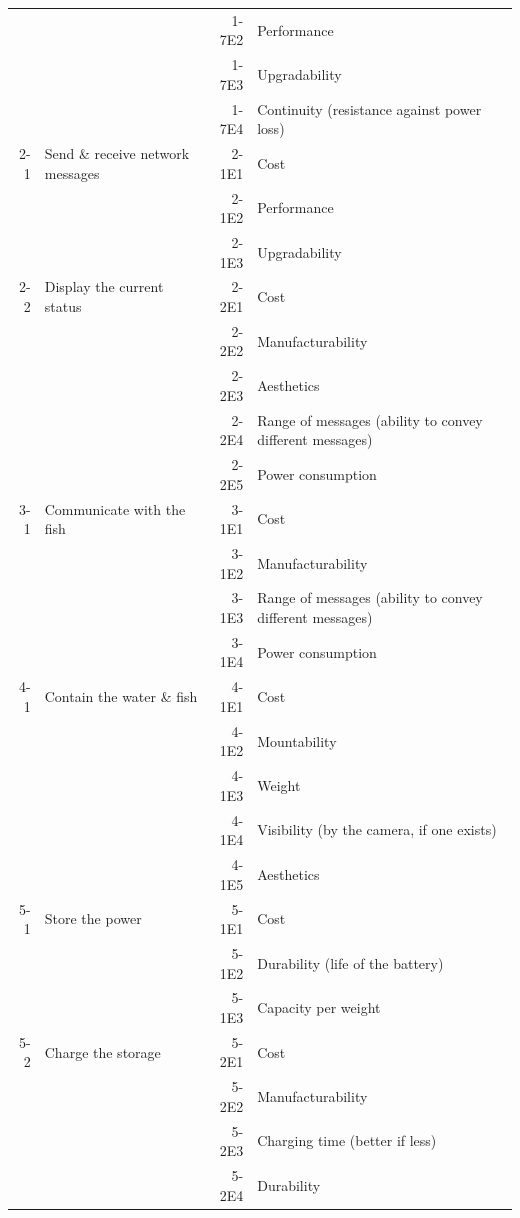 \documentclass[a4paper, 10pt, DIV=16, parskip = full, twocolumn = true]{scrartcl}
\begin{document}
\begin{table}
\begin{tabular}{rlrl}
		& & 1-7E2 & Performance \\	
		& & 1-7E3 & Upgradability \\
		& & 1-7E4 & Continuity (resistance against power loss) \\	
		2-1 & Send \& receive network messages & 2-1E1 & Cost \\
		& & 2-1E2 & Performance \\	
		& & 2-1E3 & Upgradability \\
		2-2 & Display the current status & 2-2E1 & Cost\\
		& & 2-2E2 & Manufacturability \\	
		& & 2-2E3 & Aesthetics \\	
		& & 2-2E4 & Range of messages (ability to convey different messages) \\	
		& & 2-2E5 & Power consumption \\	
		3-1 & Communicate with the fish & 3-1E1 & Cost \\
		& & 3-1E2 & Manufacturability \\		
		& & 3-1E3 & Range of messages (ability to convey different messages) \\	
		& & 3-1E4 & Power consumption \\	
		4-1 & Contain the water \& fish & 4-1E1 & Cost \\
		& & 4-1E2 & Mountability \\	
		& & 4-1E3 & Weight \\
		& & 4-1E4 & Visibility (by the camera, if one exists) \\
		& & 4-1E5 & Aesthetics \\
		5-1 & Store the power & 5-1E1 & Cost \\
		& & 5-1E2 & Durability (life of the battery) \\	
		& & 5-1E3 & Capacity per weight \\
		5-2 & Charge the storage & 5-2E1 & Cost \\
		& & 5-2E2 & Manufacturability \\	
		& & 5-2E3 & Charging time (better if less)\\
		& & 5-2E4 & Durability \\
		\bottomrule
	\end{tabular}
\label{table:criterion}
\end{table}


\end{document}
